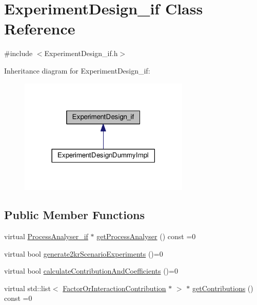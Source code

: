 \hypertarget{class_experiment_design__if}{}\section{Experiment\+Design\+\_\+if Class Reference}
\label{class_experiment_design__if}


{\ttfamily \#include $<$Experiment\+Design\+\_\+if.\+h$>$}



Inheritance diagram for Experiment\+Design\+\_\+if\+:
\nopagebreak
\begin{figure}[H]
\begin{center}
\leavevmode
\includegraphics[width=230pt]{class_experiment_design__if__inherit__graph}
\end{center}
\end{figure}
\subsection*{Public Member Functions}
\begin{DoxyCompactItemize}
\item 
virtual \hyperlink{class_process_analyser__if}{Process\+Analyser\+\_\+if} $\ast$ \hyperlink{class_experiment_design__if_ad3d35aef077b45d683e408ee756d83aa}{get\+Process\+Analyser} () const =0
\item 
virtual bool \hyperlink{class_experiment_design__if_a590a79e47f10294ed9d806baa9a98cba}{generate2kr\+Scenario\+Experiments} ()=0
\item 
virtual bool \hyperlink{class_experiment_design__if_a5e8a8698eaf74121671dd007d7a000e9}{calculate\+Contribution\+And\+Coefficients} ()=0
\item 
virtual std\+::list$<$ \hyperlink{class_factor_or_interaction_contribution}{Factor\+Or\+Interaction\+Contribution} $\ast$ $>$ $\ast$ \hyperlink{class_experiment_design__if_a249bd184b8326ec6e161321fe6fb7dbe}{get\+Contributions} () const =0
\end{DoxyCompactItemize}


